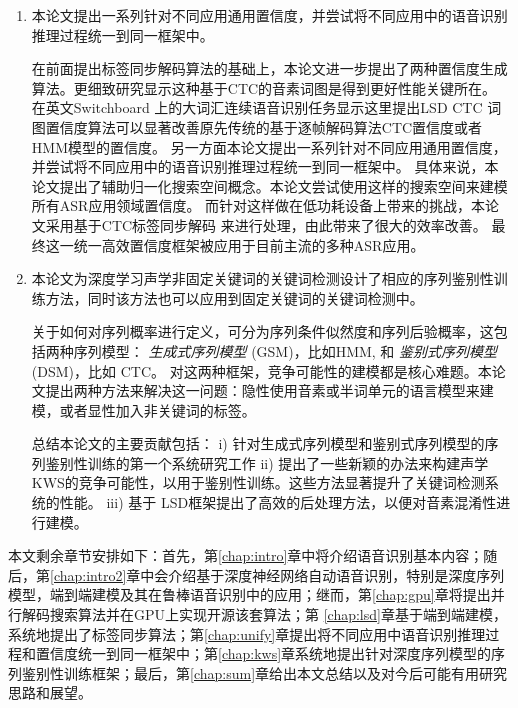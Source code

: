 \begin{enumerate}
\item 本论文提出一系列针对不同应用通用置信度，并尝试将不同应用中的语音识别推理过程统一到同一框架中。

在前面提出标签同步解码算法的基础上，本论文进一步提出了两种置信度生成算法。更细致研究显示这种基于CTC的音素词图是得到更好性能关键所在。
在英文Switchboard 上的大词汇连续语音识别任务显示这里提出LSD CTC 词图置信度算法可以显著改善原先传统的基于逐帧解码算法CTC置信度或者 HMM模型的置信度。
%
另一方面本论文提出一系列针对不同应用通用置信度，并尝试将不同应用中的语音识别推理过程统一到同一框架中。
%
具体来说，本论文提出了辅助归一化搜索空间概念。本论文尝试使用这样的搜索空间来建模所有ASR应用领域置信度。 %
而针对这样做在低功耗设备上带来的挑战，本论文采用基于CTC标签同步解码\cite{Chen+2016} 来进行处理，由此带来了很大的效率改善。
最终这一统一高效置信度框架被应用于目前主流的多种ASR应用。

\item 
本论文为深度学习声学非固定关键词的关键词检测设计了相应的序列鉴别性训练方法，同时该方法也可以应用到固定关键词的关键词检测中。

关于如何对序列概率进行定义，可分为序列条件似然度和序列后验概率，这包括两种序列模型： {\em 生成式序列模型} (GSM)，比如HMM, 和 {\em 鉴别式序列模型} (DSM)，比如 CTC。
对这两种框架，竞争可能性的建模都是核心难题。本论文提出两种方法来解决这一问题：隐性使用音素或半词单元的语言模型来建模，或者显性加入非关键词的标签。

总结本论文的主要贡献包括：
i) 针对生成式序列模型和鉴别式序列模型的序列鉴别性训练的第一个系统研究工作
ii) 提出了一些新颖的办法来构建声学KWS的竞争可能性，以用于鉴别性训练。这些方法显著提升了关键词检测系统的性能。
iii) 基于 LSD框架提出了高效的后处理方法，以便对音素混淆性进行建模。
\end{enumerate}

本文剩余章节安排如下：首先，第\ref{chap:intro}章中将介绍语音识别基本内容；随后，第\ref{chap:intro2}章中会介绍基于深度神经网络自动语音识别，特别是深度序列模型，端到端建模及其在鲁棒语音识别中的应用；继而，第\ref{chap:gpu}章将提出并行解码搜索算法并在GPU上实现开源该套算法；第
\ref{chap:lsd}章基于端到端建模，系统地提出了标签同步算法；第\ref{chap:unify}章提出将不同应用中语音识别推理过程和置信度统一到同一框架中；第\ref{chap:kws}章系统地提出针对深度序列模型的序列鉴别性训练框架；最后，第\ref{chap:sum}章给出本文总结以及对今后可能有用研究思路和展望。
